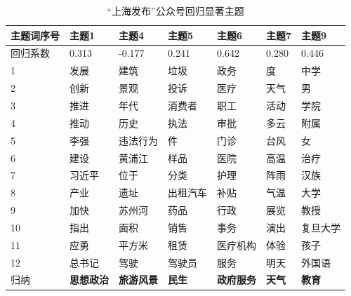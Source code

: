 \documentclass[a4paper,12pt,UTF8]{article}
\begin{document}
    \begin{table}[] \centering 
      \caption{“上海发布”公众号回归显著主题} 
      \label{tbl:shanghai-theme} 
      \begin{tabular}{@{}lllllll@{}}
      \toprule
      主题词序号 & 主题1   & 主题4    & 主题5   & 主题6   & 主题7   & 主题9   \\ \midrule
      回归系数  & 0.313 & -0.177 & 0.241 & 0.642 & 0.280 & 0.446 \\
      1     & 发展    & 建筑     & 垃圾    & 政务    & 度     & 中学    \\
      2     & 创新    & 景观     & 投诉    & 医疗    & 天气    & 男     \\
      3     & 推进    & 年代     & 消费者   & 职工    & 活动    & 学院    \\
      4     & 推动    & 历史     & 执法    & 审批    & 多云    & 附属    \\
      5     & 李强    & 违法行为   & 件     & 门诊    & 台风    & 女     \\
      6     & 建设    & 黄浦江    & 样品    & 医院    & 高温    & 治疗    \\
      7     & 习近平   & 位于     & 分类    & 护理    & 阵雨    & 汉族    \\
      8     & 产业    & 遗址     & 出租汽车  & 补贴    & 气温    & 大学    \\
      9     & 加快    & 苏州河    & 药品    & 行政    & 展览    & 教授    \\
      10    & 指出    & 面积     & 销售    & 事务    & 演出    & 复旦大学  \\
      11    & 应勇    & 平方米    & 租赁    & 医疗机构  & 体验    & 孩子    \\
      12    & 总书记   & 驾驶     & 驾驶员   & 服务    & 明天    & 外国语   \\
      归纳    & \textbf{思想政治}  & \textbf{旅游风景}   & \textbf{民生}    & \textbf{政府服务}  & \textbf{天气}    & \textbf{教育}    \\ \bottomrule
      \end{tabular}
      \end{table}
\end{document}
